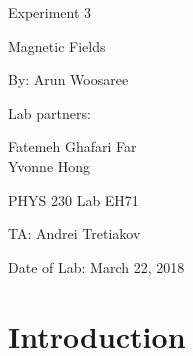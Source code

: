 \documentclass[letterpaper]{article}
\begin{document}
  \begin{titlepage}
    \begin{center}
        \vspace*{1cm}
        \Huge
        Experiment 3
        \vspace{1cm}

        Magnetic Fields
        \vspace{1cm}

        By: Arun Woosaree
        \vspace{1cm}

        Lab partners:
        \vspace{.25cm}
        \Large

        Fatemeh Ghafari Far\\
        \vspace{.25cm}
        Yvonne Hong
        \vspace{1cm}

        \Huge
        PHYS 230 Lab EH71
        \vspace{1cm}

        TA: Andrei Tretiakov
        \vspace{1cm}

        Date of Lab: March 22, 2018%
        \vfill
    \end{center}
\end{titlepage}

\section{Introduction}
\end{document}
